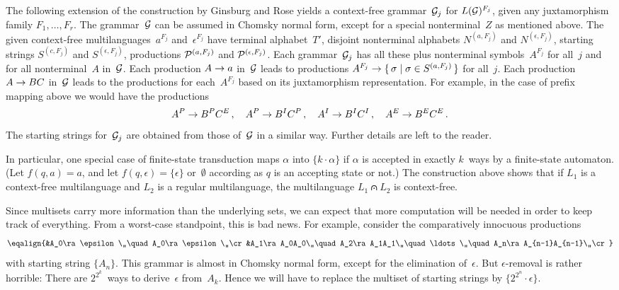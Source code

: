 The following extension of the construction by Ginsburg and Rose
yields a context-free grammar~${\cal G}_j$ for $L({\cal G})^{F_j}$,
given any juxtamorphism family $F_1,\ldots,F_r$. The grammar~${\cal
G}$ can be assumed in Chomsky normal form, except for a special
nonterminal~$Z$ as mentioned above. The given context-free
multilanguages~$a^{F_j}$ and~$\epsilon^{F_j}$ have terminal
alphabet~$T'$, disjoint nonterminal alphabets $N^{(a,F_j)}$ and
$N^{(\epsilon,F_j)}$, starting strings $S^{(c,F_j)}$ and
$S^{(\epsilon,F_j)}$, productions ${\cal P}^{(a,F_j)}$ and ${\cal
P}^{(\epsilon,F_j)}$. Each grammar~${\cal G}_j$ has all these plus
nonterminal symbols~$A^{F_j}$ for all~$j$ and for all nonterminal~$A$
in~${\cal G}$. Each production $A\rightarrow a$ in~${\cal G}$ leads to
productions $A^{F_j}\rightarrow\{\,\sigma\mid\sigma\in S^{(a,F_j)}\,\}$ for
all~$j$. Each production $A\rightarrow BC$ in~${\cal G}$ leads to the
productions for each~$A^{F_j}$ based on its juxtamorphism
representation. For example, in the case of prefix mapping above we
would have the productions
$$A^P\rightarrow B^PC^E\,,\quad A^P\rightarrow B^IC^P\,,\quad A^I\rightarrow B^IC^I\,,
\quad A^E\rightarrow B^EC^E\,.$$
The starting strings for~${\cal G}_j$ are obtained from those
of~${\cal G}$ in a similar way. 
Further details are left to the reader.

In particular, one special case of finite-state transduction maps
$\alpha$ into $\{k\cdot\alpha\}$ if $\alpha$ is accepted in exactly
$k$~ways by a finite-state automaton. (Let $f(q,a)=a$, and let
$f(q,\epsilon)=\{\epsilon\}$ or~$\emptyset$ according as $q$ is an
accepting state or not.) 
The construction above shows that if $L_1$ is a context-free
multilanguage and $L_2$ is a regular multilanguage, the multilanguage
$L_1\capdot L_2$ is context-free.

\enspace
Since multisets carry more information than the underlying sets, we
can expect that more computation will be needed in order to keep track
of everything. From a worst-case standpoint, this is bad news. For
example, consider the comparatively innocuous productions
$$\eqalign{&A_0\ra\epsilon\,,\quad A_0\ra\epsilon\,,\cr
&A_1\ra A_0A_0\,,\quad A_2\ra A_1A_1\,,\quad \ldots\,,\quad 
A_n\ra A_{n-1}A_{n-1}\,,\cr}$$
with starting string $\{A_n\}$. This grammar is almost in Chomsky
normal form, except for the elimination of~$\epsilon$. But
$\epsilon$-removal is rather horrible: There are $2^{2^k}$~ways to
derive~$\epsilon$ from~$A_k$. Hence we will have to replace the
multiset of starting strings by $\{2^{2^n}\cdot\epsilon\}$.

